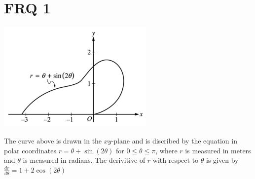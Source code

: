 \documentclass[12pt]{article}
\begin{document}
\section*{FRQ 1}
\begin{center}
	\includegraphics[width = 3in]{FRQ1.png}
\end{center}
The curve above is drawn in the $xy$-plane and is discribed by the equation in polar coordinates $r=\theta +\sin(2\theta)$ for $0\leq\theta\leq \pi$, where $r$ is measured in meters and $\theta$ is measured in radians. The derivitive of $r$ with respect to $\theta$ is given by $\frac{dr}{d\theta} = 1+2\cos(2\theta)$
\end{document}
